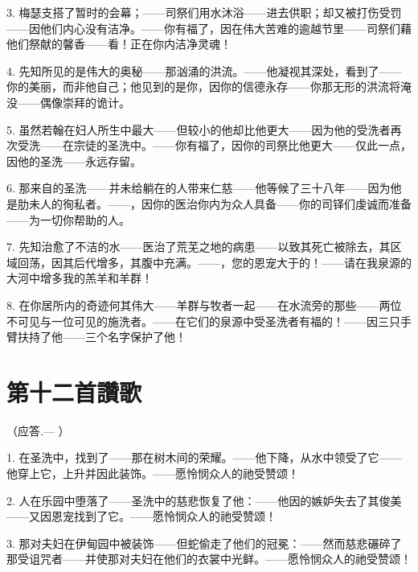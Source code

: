 3. 梅瑟支搭了暂时的会幕；——司祭们用水沐浴——进去供职；却又被打伤受罚——因他们内心没有洁净。——你有福了，因在伟大苦难的逾越节里——司祭们藉他们祭献的馨香——看！正在你内洁净灵魂！\par

4. 先知所见的是伟大的奥秘——那汹涌的洪流。——他凝视其深处，看到了——你的美丽，而非他自己；他见到的是你，因你的信德永存——你那无形的洪流将淹没——偶像崇拜的诡计。\par

5. 虽然若翰在妇人所生中最大——但较小的他却比他更大——因为他的受洗者再次受洗——在宗徒的圣洗中。——你有福了，因你的司祭比他更大——仅此一点，因他的圣洗——永远存留。\par

6. 那来自的圣洗——并未给躺在的人带来仁慈——他等候了三十八年——因为他是肋未人的徇私者。——，因你的医治你内为众人具备——你的司铎们虔诚而准备——为一切你帮助的人。\par

7. 先知治愈了不洁的水——医治了荒芜之地的病患——以致其死亡被除去，其区域回荡，因其后代增多，其腹中充满。——，您的恩宠大于的！——请在我泉源的大河中增多我的羔羊和羊群！\par

8. 在你居所内的奇迹何其伟大——羊群与牧者一起——在水流旁的那些——两位不可见与一位可见的施洗者。——在它们的泉源中受圣洗者有福的！——因三只手臂扶持了他——三个名字保护了他！\par


\section{第十二首讚歌}

（应答.— ）\par

1. 在圣洗中，找到了——那在树木间的荣耀。——他下降，从水中领受了它——他穿上它，上升并因此装饰。——愿怜悯众人的祂受赞颂！\par

2. 人在乐园中堕落了——圣洗中的慈悲恢复了他：——他因的嫉妒失去了其俊美——又因恩宠找到了它。——愿怜悯众人的祂受赞颂！\par

3. 那对夫妇在伊甸园中被装饰——但蛇偷走了他们的冠冕：——然而慈悲碾碎了那受诅咒者——并使那对夫妇在他们的衣裳中光鲜。——愿怜悯众人的祂受赞颂！\par

